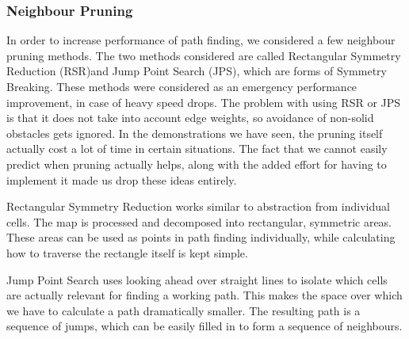 \subsubsection{Neighbour Pruning}
In order to increase performance of path finding, we considered a few neighbour pruning methods. The two methods considered are called Rectangular Symmetry Reduction (RSR)and Jump Point Search (JPS), which are forms of Symmetry Breaking. These methods were considered as an emergency performance improvement, in case of heavy speed drops. The problem with using RSR or JPS is that it does not take into account edge weights, so avoidance of non-solid obstacles gets ignored. In the demonstrations we have seen, the pruning itself actually cost a lot of time in certain situations. The fact that we cannot easily predict when pruning actually helps, along with the added effort for having to implement it made us drop these ideas entirely.

Rectangular Symmetry Reduction works similar to abstraction from individual cells. The map is processed and decomposed into rectangular, symmetric areas. These areas can be used as points in path finding individually, while calculating how to traverse the rectangle itself is kept simple.

Jump Point Search uses looking ahead over straight lines to isolate which cells are actually relevant for finding a working path. This makes the space over which we have to calculate a path dramatically smaller. The resulting path is a sequence of jumps, which can be easily filled in to form a sequence of neighbours.
